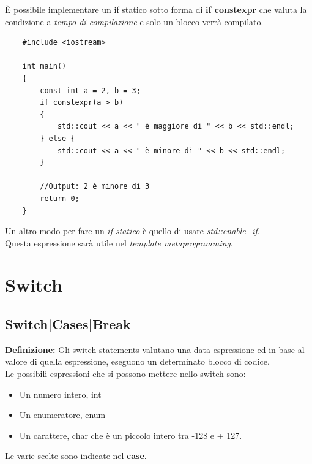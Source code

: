\textsf{\small È possibile implementare un if statico sotto forma di \textbf{if constexpr} che valuta la condizione a \emph{tempo di compilazione} e solo un blocco verrà compilato.} \\

\begin{lstlisting}
	#include <iostream>
	
	int main()
	{
		const int a = 2, b = 3;
		if constexpr(a > b)
		{
			std::cout << a << " è maggiore di " << b << std::endl;
		} else {
			std::cout << a << " è minore di " << b << std::endl;
		}
	
		//Output: 2 è minore di 3
		return 0;
	}
\end{lstlisting}

\textsf{\small Un altro modo per fare un \emph{if statico} è quello di usare \emph{std::enable\_if}.} \\

\textsf{\small Questa espressione sarà utile nel \emph{template metaprogramming}.} \\


\section{Switch}

\subsection{Switch|Cases|Break}

\textsf{\small \textbf{Definizione: } Gli switch statements valutano una data espressione ed in base al valore di quella espressione, eseguono un determinato blocco di codice.} \\

\textsf{\small Le possibili espressioni che si possono mettere nello switch sono: }

\begin{itemize}
	\item \textsf{\small Un numero intero, \color{myblue2}int}
	\item \textsf{\small Un enumeratore, \color{myblue2}enum}
	\item \textsf{\small Un carattere, \color{myblue2}char \normalcolor che è un piccolo intero tra -128 e + 127.}
\end{itemize}

\textsf{\small Le varie scelte sono indicate nel \textbf{case}.} \\

